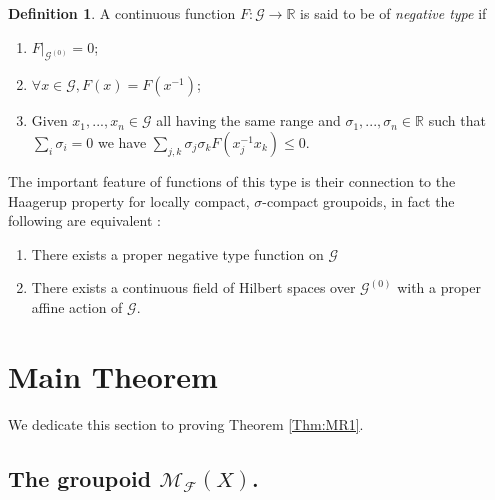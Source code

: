 \documentclass[11pt]{amsart}
\theoremstyle{plain}
\theoremstyle{definition}%
\newtheorem{definition}[theorem]{Definition}%
\theoremstyle{remark}%
\newcommand{\G}{\mathcal{G}}
\begin{document}
\begin{definition}
A continuous function $F: \G \rightarrow \mathbb{R}$ is said to be of \textit{negative type} if 
\begin{enumerate}
\item $F|_{\G^{(0)}}=0$;
\item $\forall x \in \G, F(x)=F(x^{-1})$;
\item Given $x_{1},...,x_{n} \in \G$ all having the same range and $\sigma_{1},...,\sigma_{n} \in \mathbb{R}$ such that $\sum_{i}\sigma_{i}=0$ we have $\sum_{j,k}\sigma_{j}\sigma_{k}F(x_{j}^{-1}x_{k})\leq 0$.
\end{enumerate}
\end{definition}

The important feature of functions of this type is their connection to the Haagerup property for locally compact, $\sigma$-compact groupoids, in fact the following are equivalent \cite{MR1703305}:
\begin{enumerate}
\item There exists a proper negative type function on $\G$
\item There exists a continuous field of Hilbert spaces over $\G^{(0)}$ with a proper affine action of $\G$.
\end{enumerate}

\section{Main Theorem}
We dedicate this section to proving Theorem \ref{Thm:MR1}.

\subsection{The groupoid $\mathcal{M}_{\mathcal{F}}(X)$.}
\end{document}
